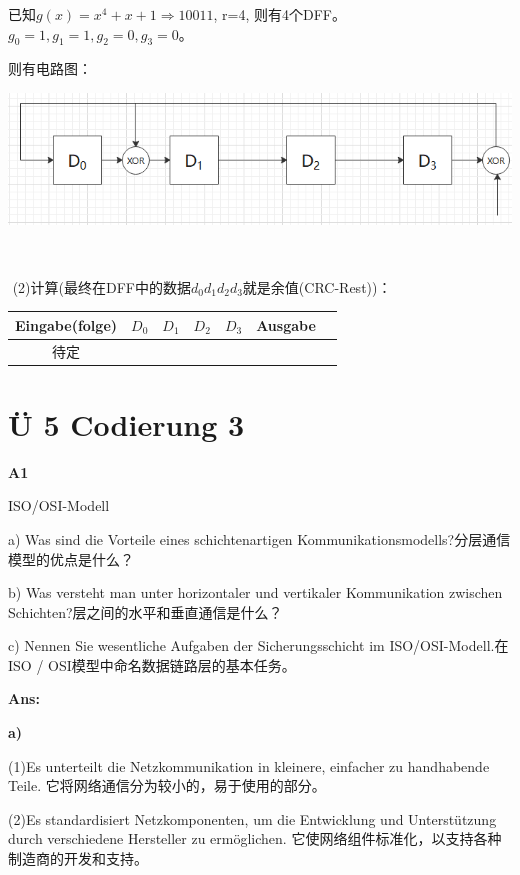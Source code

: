 \documentclass[fleqn]{article}
\begin{document}
\indent\indent 已知$g(x)=x ^ 4 + x + 1 \Rightarrow 10011$, r=4, 则有4个DFF。$g_0=1, g_1=1, g_2=0, g_3=0$。

\indent\indent 则有电路图：

\begin{center}
    \includegraphics[scale=0.4]{bild14.png}
\end{center}

\quad \quad \,\,

\quad \quad \,\,(2)计算(最终在DFF中的数据$d_0d_1d_2d_3$就是余值(CRC-Rest))：

\begin{center}
    \begin{tabular}{c|c|c|c|c|c|c}
        Eingabe(folge)&$D_0$&$D_1$&$D_2$&$D_3$&Ausgabe&\\
        \hline
        待定
    \end{tabular}
\end{center}

\section{Ü 5 Codierung 3}

\noindent\textbf{A1}

ISO/OSI-Modell

a) Was sind die Vorteile eines schichtenartigen Kommunikationsmodells?分层通信模型的优点是什么？

b) Was versteht man unter horizontaler und vertikaler Kommunikation zwischen Schichten?层之间的水平和垂直通信是什么？

c) Nennen Sie wesentliche Aufgaben der Sicherungsschicht im ISO/OSI-Modell.在ISO / OSI模型中命名数据链路层的基本任务。

\textbf{Ans:}

\textbf{a)}

\indent\indent (1)Es unterteilt die Netzkommunikation in kleinere, einfacher zu handhabende Teile.
它将网络通信分为较小的，易于使用的部分。

\indent\indent (2)Es standardisiert Netzkomponenten, um die Entwicklung und Unterstützung durch verschiedene Hersteller zu ermöglichen.
它使网络组件标准化，以支持各种制造商的开发和支持。
\end{document}
